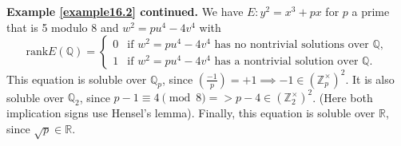 \documentclass{article}
\theoremstyle{definition}
\begin{document}
\textbf{Example \ref{example16.2} continued.} We have $E: y^2=x^3+px$ for $p$ a prime that is 5 modulo 8 and $w^2 = pu^4-4v^4$ with \[
    \text{rank}E(\mathbb{Q}) = \begin{cases}
        0 &\text{if } w^2=pu^4-4v^4 \text{ has no nontrivial solutions over }\mathbb{Q},\\
        1 &\text{if } w^2=pu^4-4v^4 \text{ has a nontrivial solution over }\mathbb{Q}.
    \end{cases}
    \]
This equation is soluble over $\mathbb{Q}_p$, since $\left(\frac{-1}{p}\right)=+1 \implies -1 \in (\mathbb{Z}_p^\times)^2$. It is also soluble over $\mathbb{Q}_2$, since $p-1 \equiv 4 \pmod{8} => p-4 \in (\mathbb{Z}_2^\times)^2$. (Here both implication signs use Hensel's lemma). Finally, this equation is soluble over $\mathbb{R}$, since $\sqrt{p} \in \mathbb{R}$.
\vspace{1mm}
 
\end{document}
